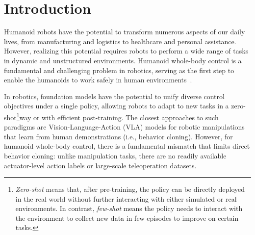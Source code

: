 \vspace{-2mm}
\section{Introduction}
\vspace{-2mm}



Humanoid robots have the potential to transform numerous aspects of our daily lives, from manufacturing and logistics to healthcare and personal assistance. However, realizing this potential requires robots to perform a wide range of tasks in dynamic and unstructured environments. Humanoid whole-body control is a fundamental and challenging problem in robotics, serving as the first step to enable the humanoids to work safely in human environments~\citep{gu2025humanoid}.

In robotics, foundation models have the potential to unify diverse control objectives under a single policy, allowing robots to adapt to new tasks in a zero-shot\footnote{\emph{Zero-shot} means that, after pre-training, the policy can be directly deployed in the real world without further interacting with either simulated or real environments. In contrast, \emph{few-shot} means the policy needs to interact with the environment to collect new data in few episodes to improve on certain tasks.}way or with efficient post-training. The closest approaches to such paradigms are Vision-Language-Action (VLA) models for robotic manipulations~\citep[e.g.,][]{Ghosh2024octo,pi05,openvla,Zhong2025DexGraspVLA, geminirobotics,grootn1} that learn from human demonstrations (i.e., behavior cloning). However, for humanoid whole-body control, there is a fundamental mismatch that limits direct behavior cloning: unlike manipulation tasks, there are no readily available actuator-level action labels or large-scale teleoperation datasets.
 
